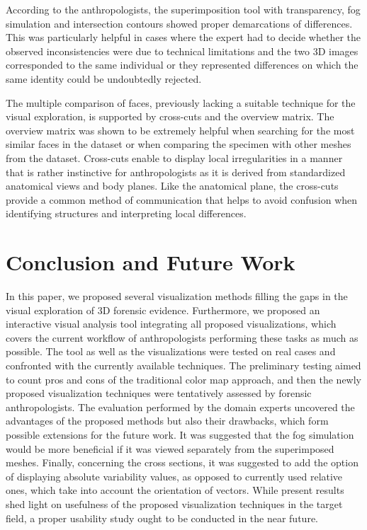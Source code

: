 \documentclass[final,5p,times]{elsarticle}
\begin{document}
According to the anthropologists, the superimposition tool with transparency, fog simulation and intersection contours showed proper demarcations of differences. This was particularly helpful in cases where the expert had to decide whether the observed inconsistencies were due to technical limitations and the two 3D images corresponded to the same individual or they represented differences on which the same identity could be undoubtedly rejected.
 
The multiple comparison of faces, previously lacking a suitable technique for the visual exploration, is supported by cross-cuts and the overview matrix. 
The overview matrix was shown to be extremely helpful when searching for the most similar faces in the dataset or when comparing the specimen with other meshes from the dataset. 
Cross-cuts enable to display local irregularities in a manner that is rather instinctive for anthropologists as it is derived from standardized anatomical views and body planes. 
Like the anatomical plane, the cross-cuts provide a common method of communication that helps to avoid confusion when identifying structures and interpreting local differences.

\section{Conclusion and Future Work} \label{conclusion}
In this paper, we proposed several visualization methods filling the gaps in the visual exploration of 3D forensic evidence.
Furthermore, we proposed an interactive visual analysis tool integrating all proposed visualizations, which covers the current workflow of anthropologists performing these tasks as much as possible.
The tool as well as the visualizations were tested on real cases and confronted with the currently available techniques. 
The preliminary testing aimed to count pros and cons of the traditional color map approach, and then the newly proposed visualization techniques were tentatively assessed by forensic anthropologists. 
The evaluation performed by the domain experts uncovered the advantages of the proposed methods but also their drawbacks, which form possible extensions for the future work. 
It was suggested that the fog simulation would be more beneficial if it was viewed separately from the superimposed meshes. 
Finally, concerning the cross sections, it was suggested to add the option of displaying absolute variability values, as opposed to currently used relative ones, which take into account the orientation of vectors.
While present results shed light on usefulness of the proposed visualization techniques in the target field, a proper usability study ought to be conducted in the near future. 
\end{document}
